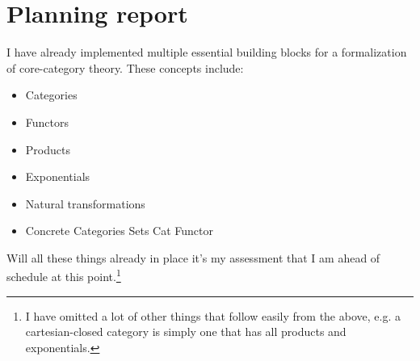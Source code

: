 \section{Planning report}
%
I have already implemented multiple essential building blocks for a
formalization of core-category theory. These concepts include:
%
\begin{itemize}
\item
Categories
\item
Functors
\item
Products
\item
Exponentials
\item
Natural transformations
\item
Concrete Categories
\subitem
Sets
\subitem
Cat
\subitem
Functor
\end{itemize}
%
Will all these things already in place it's my assessment that I am ahead of
schedule at this point.\footnote{I have omitted a lot of other things that
  follow easily from the above, e.g. a cartesian-closed category is simply one
  that has all products and exponentials.}

